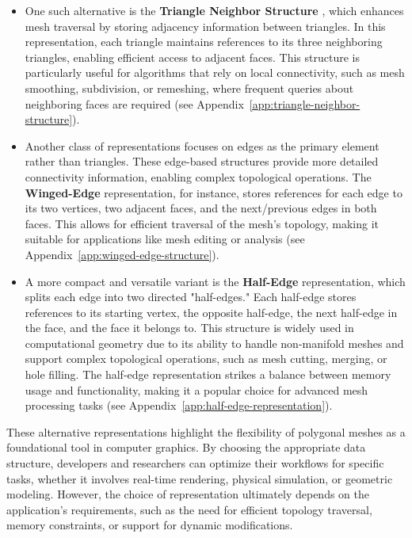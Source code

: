 \begin{itemize}
    \item One such alternative is the \textbf{Triangle Neighbor Structure} \citep{botsch2006openmesh}, which enhances mesh traversal by storing adjacency information between triangles. In this representation, each triangle maintains references to its three neighboring triangles, enabling efficient access to adjacent faces. This structure is particularly useful for algorithms that rely on local connectivity, such as mesh smoothing, subdivision, or remeshing, where frequent queries about neighboring faces are required (see Appendix~\ref{app:triangle-neighbor-structure}).

    \item Another class of representations focuses on edges as the primary element rather than triangles. These edge-based structures provide more detailed connectivity information, enabling complex topological operations. The \textbf{Winged-Edge} \citep{baumgart1975winged} representation, for instance, stores references for each edge to its two vertices, two adjacent faces, and the next/previous edges in both faces. This allows for efficient traversal of the mesh's topology, making it suitable for applications like mesh editing or analysis (see Appendix~\ref{app:winged-edge-structure}).

    \item A more compact and versatile variant is the \textbf{Half-Edge} \citep{mantyla1988introduction} representation, which splits each edge into two directed "half-edges." Each half-edge stores references to its starting vertex, the opposite half-edge, the next half-edge in the face, and the face it belongs to. This structure is widely used in computational geometry due to its ability to handle non-manifold meshes and support complex topological operations, such as mesh cutting, merging, or hole filling. The half-edge representation strikes a balance between memory usage and functionality, making it a popular choice for advanced mesh processing tasks (see Appendix~\ref{app:half-edge-representation}).
\end{itemize}

These alternative representations highlight the flexibility of polygonal meshes as a foundational tool in computer graphics. By choosing the appropriate data structure, developers and researchers can optimize their workflows for specific tasks, whether it involves real-time rendering, physical simulation, or geometric modeling. However, the choice of representation ultimately depends on the application's requirements, such as the need for efficient topology traversal, memory constraints, or support for dynamic modifications.






